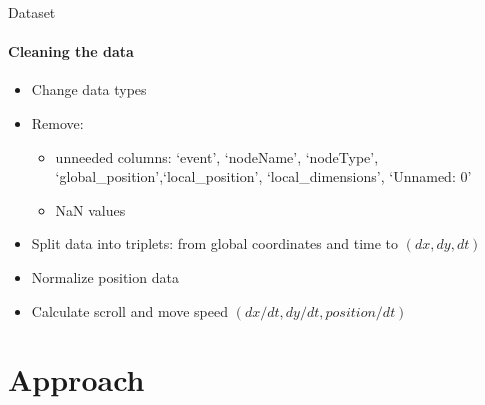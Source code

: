\documentclass{beamer}
\begin{document}
\begin{frame}{Dataset}
\framesubtitle{Cleaning the data}
    \begin{itemize}
        \item Change data types
        \begin{table}[!ht]
            \centering
            \caption{Data and respective data types}
            \label{tab:data-cleaning}
        \end{table}
        \item Remove:
        \begin{itemize}
            \item unneeded columns: `event', `nodeName', `nodeType', `global\_position',`local\_position',
        `local\_dimensions', `Unnamed: 0'
            \item NaN values
        \end{itemize}
        \item Split data into triplets: from global coordinates and time to $(dx, dy, dt)$
        \item Normalize position data
        \item Calculate scroll and move speed $(dx/dt, dy/dt, position/dt)$
    \end{itemize}
\end{frame}


\section{Approach}
\end{document}
